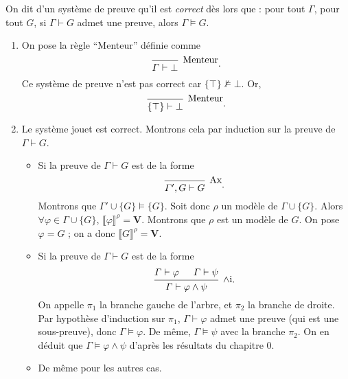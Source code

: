 \begin{defn}[Correction]
	On dit d'un système de preuve qu'il est \textit{correct} dès lors que : 
	pour tout $\Gamma$, pour tout $G$, si $\Gamma \vdash G$\/ admet une preuve, alors $\Gamma \models G$.
\end{defn}

\begin{exm}
	\begin{enumerate}
		\item On pose la règle ``Menteur'' définie comme \[
				\begin{prooftree}
					\infer0[Menteur]{\Gamma\vdash \bot} %
				\end{prooftree}
			.\] Ce système de preuve n'est pas correct car $\{\top\} \not\models \bot$. Or, \[
				\begin{prooftree}
					\infer0[Menteur]{\{\top\} \vdash\bot} %
				\end{prooftree}
			.\]
		\item Le système jouet est correct. Montrons cela par induction sur la preuve de $\Gamma \vdash G$.
			\begin{itemize}
				\item Si la preuve de $\Gamma \vdash G$\/ est de la forme \[
						\begin{prooftree}
							\infer0[Ax]{\Gamma',G \vdash G} %
						\end{prooftree}
					.\] Montrons que $\Gamma' \cup \{G\} \models \{G\}$.
					Soit donc $\rho$\/ un modèle de $\Gamma \cup \{G\}$. Alors $\forall \varphi \in \Gamma \cup \{G\}$, $\llbracket \varphi \rrbracket^\rho = \mathbf{V}$. Montrons que $\rho$\/ est un modèle de $G$.
					On pose $\varphi = G$\/ ; on a donc $\llbracket G \rrbracket^\rho = \mathbf{V}$.
				\item Si la preuve de $\Gamma \vdash G$\/ est de la forme \[
						\begin{prooftree}
							\hypo{\Gamma \vdash \varphi} %
							\hypo{\Gamma \vdash \psi}
							\infer2[$\land$i]{\Gamma \vdash \varphi \land \psi}
						\end{prooftree}
					.\] On appelle $\pi_1$\/ la branche gauche de l'arbre, et $\pi_2$\/ la branche de droite.
					Par hypothèse d'induction sur $\pi_1$\/, $\Gamma \vdash \varphi$\/ admet une preuve (qui est une sous-preuve), donc $\Gamma\models \varphi$. De même, $\Gamma \models \psi$ avec la branche $\pi_2$.
					On en déduit que $\Gamma \models \varphi \land \psi$\/ d'après les résultats du chapitre 0.
				\item De même pour les autres cas.
			\end{itemize}
	\end{enumerate}
\end{exm}


